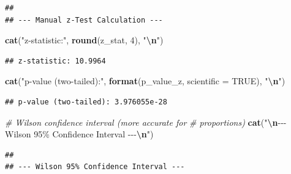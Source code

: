 \documentclass[
  12pt,
]{article}
\newenvironment{Shaded}{\begin{snugshade}}{\end{snugshade}}
\newcommand{\AttributeTok}[1]{\textcolor[rgb]{0.13,0.29,0.53}{#1}}
\newcommand{\CommentTok}[1]{\textcolor[rgb]{0.56,0.35,0.01}{\textit{#1}}}
\newcommand{\ConstantTok}[1]{\textcolor[rgb]{0.56,0.35,0.01}{#1}}
\newcommand{\DecValTok}[1]{\textcolor[rgb]{0.00,0.00,0.81}{#1}}
\newcommand{\FunctionTok}[1]{\textcolor[rgb]{0.13,0.29,0.53}{\textbf{#1}}}
\newcommand{\NormalTok}[1]{#1}
\newcommand{\OtherTok}[1]{\textcolor[rgb]{0.56,0.35,0.01}{#1}}
\newcommand{\SpecialCharTok}[1]{\textcolor[rgb]{0.81,0.36,0.00}{\textbf{#1}}}
\newcommand{\StringTok}[1]{\textcolor[rgb]{0.31,0.60,0.02}{#1}}
\begin{document}
\begin{verbatim}
## 
## --- Manual z-Test Calculation ---
\end{verbatim}

\begin{Shaded}
\begin{Highlighting}[]
\FunctionTok{cat}\NormalTok{(}\StringTok{"z{-}statistic:"}\NormalTok{, }\FunctionTok{round}\NormalTok{(z\_stat, }\DecValTok{4}\NormalTok{), }\StringTok{"}\SpecialCharTok{\textbackslash{}n}\StringTok{"}\NormalTok{)}
\end{Highlighting}
\end{Shaded}

\begin{verbatim}
## z-statistic: 10.9964
\end{verbatim}

\begin{Shaded}
\begin{Highlighting}[]
\FunctionTok{cat}\NormalTok{(}\StringTok{"p{-}value (two{-}tailed):"}\NormalTok{, }\FunctionTok{format}\NormalTok{(p\_value\_z, }\AttributeTok{scientific =} \ConstantTok{TRUE}\NormalTok{),}
    \StringTok{"}\SpecialCharTok{\textbackslash{}n}\StringTok{"}\NormalTok{)}
\end{Highlighting}
\end{Shaded}

\begin{verbatim}
## p-value (two-tailed): 3.976055e-28
\end{verbatim}

\begin{Shaded}
\begin{Highlighting}[]
\CommentTok{\# Wilson confidence interval (more accurate for}
\CommentTok{\# proportions)}
\FunctionTok{cat}\NormalTok{(}\StringTok{"}\SpecialCharTok{\textbackslash{}n}\StringTok{{-}{-}{-} Wilson 95\% Confidence Interval {-}{-}{-}}\SpecialCharTok{\textbackslash{}n}\StringTok{"}\NormalTok{)}
\end{Highlighting}
\end{Shaded}

\begin{verbatim}
## 
## --- Wilson 95% Confidence Interval ---
\end{verbatim}

\begin{Shaded}
\end{Shaded}
\end{document}
